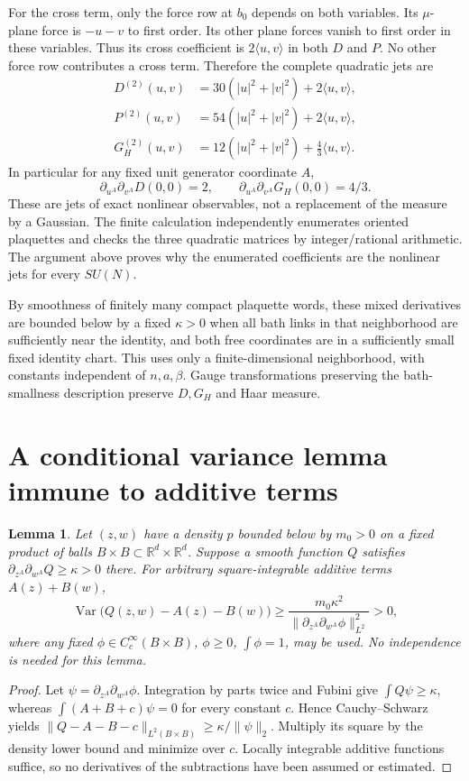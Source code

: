 \documentclass[11pt]{article}
\newtheorem{lemma}{Lemma}
\newcommand{\Var}{\operatorname{Var}}
\begin{document}
For the cross term, only the force row at $b_0$ depends on both variables.
Its $\mu$-plane force is $-u-v$ to first order. Its other plane forces vanish
to first order in these variables. Thus its cross coefficient is
$2\langle u,v\rangle$ in both $D$ and $P$. No other force row contributes
a cross term. Therefore the complete quadratic jets are
\begin{align}
 D^{(2)}(u,v)&=30(|u|^2+|v|^2)+2\langle u,v\rangle,\label{jetD}\\
 P^{(2)}(u,v)&=54(|u|^2+|v|^2)+2\langle u,v\rangle,\\
 G_H^{(2)}(u,v)&=12(|u|^2+|v|^2)+\tfrac43\langle u,v\rangle.\label{jetH}
\end{align}
In particular for any fixed unit generator coordinate $A$,
\[
 \partial_{u^A}\partial_{v^A}D(0,0)=2,\qquad
 \partial_{u^A}\partial_{v^A}G_H(0,0)=4/3.
\]
These are jets of exact nonlinear observables, not a replacement of the
measure by a Gaussian. The finite calculation
independently enumerates oriented plaquettes and checks the three quadratic
matrices by integer/rational arithmetic. The argument above proves why the
enumerated coefficients are the nonlinear jets for every $SU(N)$.

By smoothness of finitely many compact plaquette words, these mixed
derivatives are bounded below by a fixed $\kappa>0$ when all bath links
in that neighborhood are sufficiently near the identity, and both free
coordinates are in a sufficiently small fixed identity chart. This uses
only a finite-dimensional neighborhood, with constants independent of
$n,a,\beta$. Gauge transformations preserving the bath-smallness description
preserve $D,G_H$ and Haar measure.

\section{A conditional variance lemma immune to additive terms}
\begin{lemma}\label{mixed}
Let $(z,w)$ have a density $p$ bounded below by $m_0>0$ on a fixed product
of balls $B\times B\subset\mathbb R^d\times\mathbb R^d$. Suppose a smooth
function $Q$ satisfies $\partial_{z^A}\partial_{w^A}Q\ge\kappa>0$ there.
For arbitrary square-integrable additive terms $A(z)+B(w)$,
\[
 \Var\bigl(Q(z,w)-A(z)-B(w)\bigr)\ge
 \frac{m_0\kappa^2}{\|\partial_{z^A}\partial_{w^A}\phi\|_{L^2}^2}>0,
\]
where any fixed $\phi\in C_c^\infty(B\times B)$, $\phi\ge0$,
$\int\phi=1$, may be used. No independence is needed for this lemma.
\end{lemma}
\begin{proof}
Let $\psi=\partial_{z^A}\partial_{w^A}\phi$. Integration by parts twice
and Fubini give $\int Q\psi\ge\kappa$, whereas $\int(A+B+c)\psi=0$ for
every constant $c$. Hence Cauchy--Schwarz yields
$\|Q-A-B-c\|_{L^2(B\times B)}\ge\kappa/\|\psi\|_2$.
Multiply its square by the density lower bound and minimize over $c$.
Locally integrable additive functions suffice, so no derivatives of the
subtractions have been assumed or estimated.
\end{proof}
\end{document}
